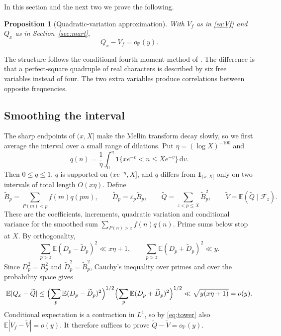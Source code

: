 \documentclass[11pt]{amsart}
\newtheorem{proposition}[theorem]{Proposition}
\theoremstyle{remark}
\numberwithin{equation}{section}
\newcommand{\E}{\mathbb{E}}
\renewcommand{\P}{\mathbb{P}}
\newcommand{\one}{\mathbf{1}}
\newcommand{\dd}{\,\mathrm{d}}
\newcommand{\tQ}{\widetilde{Q}}
\newcommand{\tV}{\widetilde{V}}
\newcommand{\tB}{\widetilde{B}}
\newcommand{\tD}{\widetilde{D}}
\begin{document}
In this section and the next two we prove the following.

\begin{proposition}[Quadratic-variation approximation]\label{prop:qv}
With $V_f$ as in \eqref{eq:Vf} and $Q_x$ as in Section~\ref{sec:mart},
\[
Q_x-V_f=o_\P(y).
\]
\end{proposition}

The structure follows the conditional fourth-moment method of \cite[Section~4]{HSX}. The difference is that a perfect-square quadruple of real characters is described by six free variables instead of four. The two extra variables produce correlations between opposite frequencies.

\subsection{Smoothing the interval}
The sharp endpoints of $(x,X]$ make the Mellin transform decay slowly, so we first average the interval over a small range of dilations. Put $\eta=(\log X)^{-100}$ and
\[
q(n)=\frac1\eta\int_0^\eta\one\{xe^{-v}<n\le Xe^{-v}\}\dd v .
\]
Then $0\le q\le1$, $q$ is supported on $(xe^{-\eta},X]$, and $q$ differs from $\one_{(x,X]}$ only on two intervals of total length $O(x\eta)$. Define
\[
\tB_p=\sum_{P(m)<p}f(m)q(pm),\qquad\tD_p=\varepsilon_p\tB_p,\qquad\tQ=\sum_{z<p\le X}\tB_p^2,\qquad\tV=\E(\tQ\mid\mathcal F_z).
\]
These are the coefficients, increments, quadratic variation and conditional variance for the smoothed sum $\sum_{P(n)>z}f(n)q(n)$. Prime sums below stop at $X$. By orthogonality,
\[
\sum_{p>z}\E(D_p-\tD_p)^2\ll x\eta+1,\qquad\sum_{p>z}\E(D_p+\tD_p)^2\ll y .
\]
Since $D_p^2=B_p^2$ and $\tD_p^2=\tB_p^2$, Cauchy's inequality over primes and over the probability space gives
\begin{equation}\label{eq:smoothQ}
\E|Q_x-\tQ|\le\Bigl(\sum_p\E(D_p-\tD_p)^2\Bigr)^{1/2}\Bigl(\sum_p\E(D_p+\tD_p)^2\Bigr)^{1/2}\ll\sqrt{y(x\eta+1)}=o(y).
\end{equation}
Conditional expectation is a contraction in $L^1$, so by \eqref{eq:tower} also $\E|V_f-\tV|=o(y)$. It therefore suffices to prove $\tQ-\tV=o_\P(y)$.
\end{document}
